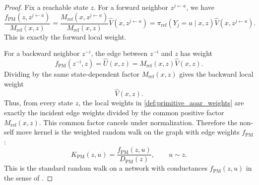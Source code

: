 \documentclass{article}
\numberwithin{theorem}{section}
\numberwithin{proposition}{section}
\numberwithin{corollary}{section}
\numberwithin{lemma}{section}
\numberwithin{conjecture}{section}
\numberwithin{remark}{section}
\numberwithin{definition}{section}
\numberwithin{assumption}{section}
\numberwithin{example}{section}
\providecommand{\base}{\pi_{\mathrm{ref}}}
\begin{document}
\begin{proof}
Fix a reachable state $z$. For a forward neighbor $z^{j\leftarrow a}$, we have
\begin{equation*}
    \frac{f_{\mathrm{PM}}(z,z^{j\leftarrow a})}{M_{\text{ref}}(x,z)} = \frac{M_{\text{ref}}(x,z^{j\leftarrow a})}{M_{\text{ref}}(x,z)}\widehat V(x,z^{j\leftarrow a}) = \base(Y_j=a\mid x,z)\widehat V(x,z^{j\leftarrow a}).
\end{equation*}
This is exactly the forward local weight.

For a backward neighbor $z^{-i}$, the edge between $z^{-i}$ and $z$ has weight
\begin{equation*}
    f_{\mathrm{PM}}(z^{-i},z) = \widehat U(x,z) = M_{\text{ref}}(x,z)\widehat V(x,z).
\end{equation*}
Dividing by the same state-dependent factor $M_{\text{ref}}(x,z)$ gives the backward local weight
\begin{equation*}
    \widehat V(x,z).
\end{equation*}
Thus, from every state $z$, the local weights in \cref{def:primitive_aoar_weights} are exactly the incident edge weights divided by the common positive factor $M_{\text{ref}}(x,z)$. This common factor cancels under normalization. Therefore the non-self move kernel is the weighted random walk on the graph with edge weights $f_{\mathrm{PM}}$:
\begin{equation*}
    K_{\mathrm{PM}}(z,u) = \frac{f_{\mathrm{PM}}(z,u)}{D_{\mathrm{PM}}(z)}, \qquad u\sim z.
\end{equation*}
This is the standard random walk on a network with conductances $f_{\mathrm{PM}}(z,u)$ in the sense of \citet{levin2017markov}.


\end{proof}
\end{document}

